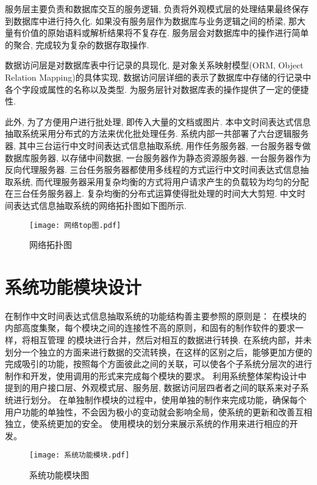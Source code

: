 服务层主要负责和数据库交互的服务逻辑, 负责将外观模式层的处理结果最终保存到数据库中进行持久化.
如果没有服务层作为数据库与业务逻辑之间的桥梁, 那大量有价值的原始语料或解析结果将不复存在.
服务层会对数据库中的操作进行简单的聚合, 完成较为复杂的数据存取操作.

数据访问层是对数据库表中行记录的具现化, 是对象关系映射模型(ORM, Object Relation Mapping)的具体实现, 数据访问层详细的表示了数据库中存储的行记录中各个字段或属性的名称以及类型.
为服务层针对数据库表的操作提供了一定的便捷性.

此外, 为了方便用户进行批处理, 即传入大量的文档或图片. 本中文时间表达式信息抽取系统采用分布式的方法来优化批处理任务.
系统内部一共部署了六台逻辑服务器, 其中三台运行中文时间表达式信息抽取系统, 用作任务服务器, 一台服务器专做数据库服务器, 以存储中间数据, 一台服务器作为静态资源服务器, 一台服务器作为反向代理服务器.
三台任务服务器都使用多线程的方式运行中文时间表达式信息抽取系统, 而代理服务器采用复杂均衡的方式将用户请求产生的负载较为均匀的分配在三台任务服务器上. 复杂均衡的分布式运算使得批处理的时间大大剪短.
中文时间表达式信息抽取系统的网络拓扑图如下图所示.

\begin{figure}[h]
  \centering
  \texttt{[image: 网络top图.pdf]}
  \caption{网络拓扑图}
  \label{fig:network_top}
\end{figure}

\section{系统功能模块设计}

在制作中文时间表达式信息抽取系统的功能结构善主要参照的原则是：
在模块的内部高度集聚，每个模块之间的连接性不高的原则，和固有的制作软件的要求一样，将相互管理
的模块进行合并，然后对相互的数据进行转换.
在系统内部，并未划分一个独立的方面来进行数据的交流转换，在这样的区别之后，能够更加方便的完成吸引的功能，按照每个方面彼此之间的关联，可以使各个子系统分层次的进行制作和开发，使用调用的形式来完成每个模块的要求。
利用系统整体架构设计中提到的用户接口层、外观模式层、服务层, 数据访问层四者者之间的联系来对子系统进行划分。
在单独制作模块的过程中，使用单独的制作来完成功能，确保每个用户功能的单独性，不会因为极小的变动就会影响全局，使系统的更新和改善互相独立，使系统更加的安全。
使用模块的划分来展示系统的作用来进行相应的开发。

\begin{figure}[h]
  \centering
  \texttt{[image: 系统功能模块.pdf]}
  \caption{系统功能模块图}
  \label{fig:system_feature}
\end{figure}

